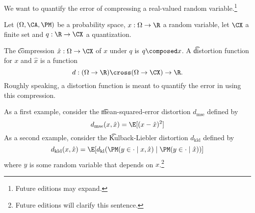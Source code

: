 


We want to quantify the error of compressing a real-valued random variable.\footnote{Future editions may expand.}


Let $(\Omega, \CA, \PM)$ be a probability space, $x: \Omega \to \R$ a random variable, let $\CX$ a finite set and $q: \R \to \CX$ a quantization.


The \t{compression} $\hat{x}: \Omega \to \CX$ of $x$ under $q$ is $q \composed x$.
A \t{distortion function} for $x$ and $\hat{x}$ is a function
\[
  d: (\Omega \to \R) \cross (\Omega \to \CX) \to \R.
\]
Roughly speaking, a distortion function is meant to quantify the error in using this compression.


As a first example, consider the \t{mean-squared-error distortion} $d_{\text{mse}}$ defined by
\[
  d_{\text{mse}}(x, \hat{x}) = \E[(x - \hat{x})^2]
\]
As a second example, consider the \t{Kulback-Liebler distortion} $d_{\text{kld}}$ defined by
\[
    d_{\text{kld}}(x, \hat{x}) = \E[d_{\text{kl}}(\PM(y \in \cdot \mid x, \hat{x}) \mid \PM(y \in \cdot \mid \hat{x}))]
\]
where $y$ is some random variable that depends on $x$.\footnote{Future editions will clarify this sentence.}


\blankpage

